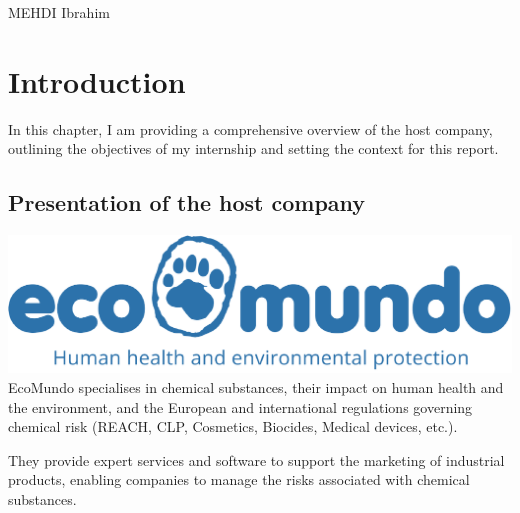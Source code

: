 \documentclass[a4paper,12pt,twoside]{report}
\begin{document}
MEHDI Ibrahim
\newpage
{}
\begin{abstract}

\end{abstract}

\newpage


\tableofcontents{}

\thispagestyle{empty}

\newpage

\listoffigures  %


\thispagestyle{empty}

\newpage
\thispagestyle{empty}
\listoftables   %
\thispagestyle{empty}

\printglossary[type=\acronymtype]

\thispagestyle{empty}

\newpage

\chapter{Introduction}
In this chapter, I am providing a comprehensive overview of the host company, outlining the objectives of my internship and setting the context for this report.
\section{Presentation of the host company}
\includegraphics[width=\textwidth]{images/ecomundo}
EcoMundo \cite{ecomundo} specialises in chemical substances, their impact on human health and the environment, and the European and international regulations governing chemical risk (REACH, CLP, Cosmetics, Biocides, Medical devices, etc.).

They provide expert services and software to support the marketing of industrial products, enabling companies to manage the risks associated with chemical substances.
\end{document}
